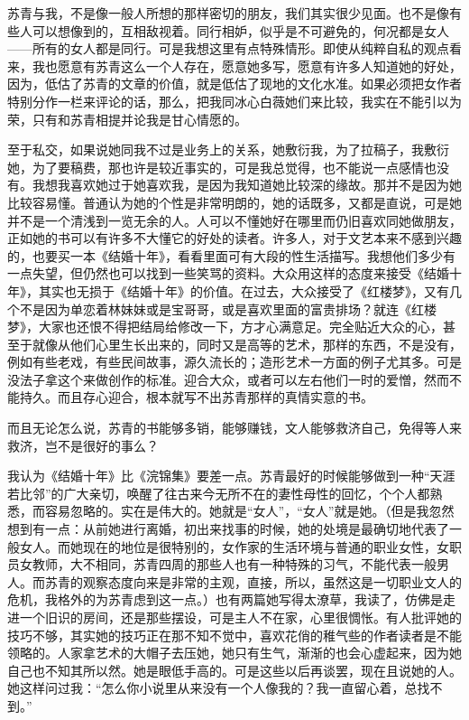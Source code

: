\par 苏青与我，不是像一般人所想的那样密切的朋友，我们其实很少见面。也不是像有些人可以想像到的，互相敌视着。同行相妒，似乎是不可避免的，何况都是女人——所有的女人都是同行。可是我想这里有点特殊情形。即使从纯粹自私的观点看来，我也愿意有苏青这么一个人存在，愿意她多写，愿意有许多人知道她的好处，因为，低估了苏青的文章的价值，就是低估了现地的文化水准。如果必须把女作者特别分作一栏来评论的话，那么，把我同冰心白薇她们来比较，我实在不能引以为荣，只有和苏青相提并论我是甘心情愿的。
\par 至于私交，如果说她同我不过是业务上的关系，她敷衍我，为了拉稿子，我敷衍她，为了要稿费，那也许是较近事实的，可是我总觉得，也不能说一点感情也没有。我想我喜欢她过于她喜欢我，是因为我知道她比较深的缘故。那并不是因为她比较容易懂。普通认为她的个性是非常明朗的，她的话既多，又都是直说，可是她并不是一个清浅到一览无余的人。人可以不懂她好在哪里而仍旧喜欢同她做朋友，正如她的书可以有许多不大懂它的好处的读者。许多人，对于文艺本来不感到兴趣的，也要买一本《结婚十年》，看看里面可有大段的性生活描写。我想他们多少有一点失望，但仍然也可以找到一些笑骂的资料。大众用这样的态度来接受《结婚十年》，其实也无损于《结婚十年》的价值。在过去，大众接受了《红楼梦》，又有几个不是因为单恋着林妹妹或是宝哥哥，或是喜欢里面的富贵排场？就连《红楼梦》，大家也还恨不得把结局给修改一下，方才心满意足。完全贴近大众的心，甚至于就像从他们心里生长出来的，同时又是高等的艺术，那样的东西，不是没有，例如有些老戏，有些民间故事，源久流长的；造形艺术一方面的例子尤其多。可是没法子拿这个来做创作的标准。迎合大众，或者可以左右他们一时的爱憎，然而不能持久。而且存心迎合，根本就写不出苏青那样的真情实意的书。
\par 而且无论怎么说，苏青的书能够多销，能够赚钱，文人能够救济自己，免得等人来救济，岂不是很好的事么？
\par 我认为《结婚十年》比《浣锦集》要差一点。苏青最好的时候能够做到一种“天涯若比邻”的广大亲切，唤醒了往古来今无所不在的妻性母性的回忆，个个人都熟悉，而容易忽略的。实在是伟大的。她就是“女人”，“女人”就是她。（但是我忽然想到有一点：从前她进行离婚，初出来找事的时候，她的处境是最确切地代表了一般女人。而她现在的地位是很特别的，女作家的生活环境与普通的职业女性，女职员女教师，大不相同，苏青四周的那些人也有一种特殊的习气，不能代表一般男人。而苏青的观察态度向来是非常的主观，直接，所以，虽然这是一切职业文人的危机，我格外的为苏青虑到这一点。）也有两篇她写得太潦草，我读了，仿佛是走进一个旧识的房间，还是那些摆设，可是主人不在家，心里很惆怅。有人批评她的技巧不够，其实她的技巧正在那不知不觉中，喜欢花俏的稚气些的作者读者是不能领略的。人家拿艺术的大帽子去压她，她只有生气，渐渐的也会心虚起来，因为她自己也不知其所以然。她是眼低手高的。可是这些以后再谈罢，现在且说她的人。她这样问过我：“怎么你小说里从来没有一个人像我的？我一直留心着，总找不到。”

